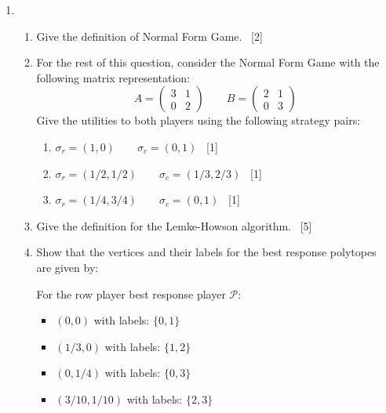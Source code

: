 \documentclass[12pt,a4paper]{article}
\renewcommand{\labelenumi}{\arabic{enumi}} %
\begin{document}
\null \vskip1cm
\begin{enumerate}

\renewcommand\labelenumi{\bfseries\theenumi.}

\item

    \begin{enumerate}
        \item Give the definition of Normal Form Game.
        ~\hfill{[2]}
        \item For the rest of this question, consider the Normal Form Game with
            the following matrix representation:
            $$A=
                \begin{pmatrix}
                    3 & 1\\
                    0 & 2
                \end{pmatrix}
              \qquad
              B=
                \begin{pmatrix}
                    2 & 1\\
                    0 & 3
                \end{pmatrix}
            $$
            Give the utilities to both players using the following strategy
            pairs:

            \begin{enumerate}
                \item $\sigma_r=(1, 0)\qquad\sigma_c=(0,1)$
                    ~\hfill{[1]}
                \item $\sigma_r=(1/2, 1/2)\qquad\sigma_c=(1/3,2/3)$
                    ~\hfill{[1]}
                \item $\sigma_r=(1/4, 3/4)\qquad\sigma_c=(0,1)$
                    ~\hfill{[1]}
            \end{enumerate}
        \item Give the definition for the Lemke-Howson algorithm.
            ~\hfill{[5]}
        \item Show that the vertices and their labels for the best response 
            polytopes are given by:

            For the row player best response player \(\mathcal{P}\):

            \begin{itemize}
                \item $(0, 0)$ with labels: $\{0, 1\}$
                \item $(1/3, 0)$ with labels: $\{1, 2\}$
                \item $(0, 1/4)$ with labels: $\{0, 3\}$
                \item $(3/10, 1/10)$ with labels: $\{2, 3\}$
            \end{itemize}


\end{enumerate}
\end{enumerate}
\end{document}
